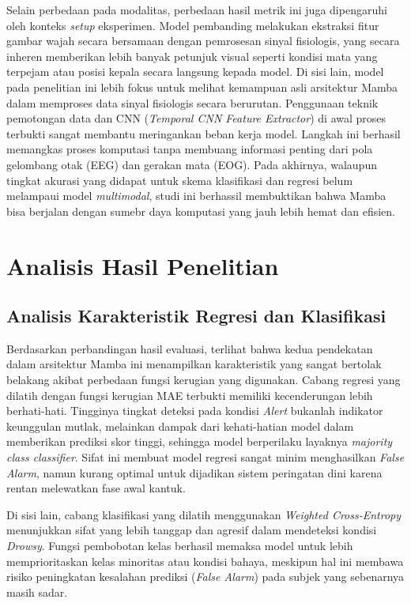 Selain perbedaan pada modalitas, perbedaan hasil metrik ini juga dipengaruhi oleh konteks \textit{setup} eksperimen. Model pembanding melakukan ekstraksi fitur gambar wajah secara bersamaan dengan pemrosesan sinyal fisiologis, yang secara inheren memberikan lebih banyak petunjuk visual seperti kondisi mata yang terpejam atau posisi kepala secara langsung kepada model. Di sisi lain, model pada penelitian ini lebih fokus untuk melihat kemampuan asli arsitektur Mamba dalam memproses data sinyal fisiologis secara berurutan. Penggunaan teknik pemotongan data dan CNN (\textit{Temporal CNN Feature Extractor}) di awal proses terbukti sangat membantu meringankan beban kerja model. Langkah ini berhasil memangkas proses komputasi tanpa membuang informasi penting dari pola gelombang otak (EEG) dan gerakan mata (EOG). Pada akhirnya, walaupun tingkat akurasi yang didapat untuk skema klasifikasi dan regresi belum melampaui model \textit{multimodal}, studi ini berhassil membuktikan bahwa Mamba bisa berjalan dengan sumebr daya komputasi yang jauh lebih hemat dan efisien. 

\section{Analisis Hasil Penelitian}

\subsection{Analisis Karakteristik Regresi dan Klasifikasi}
\label{subsec:analisis_karakteristik}

Berdasarkan perbandingan hasil evaluasi, terlihat bahwa kedua pendekatan dalam arsitektur Mamba ini menampilkan karakteristik yang sangat bertolak belakang akibat perbedaan fungsi kerugian yang digunakan. Cabang regresi yang dilatih dengan fungsi kerugian MAE terbukti memiliki kecenderungan lebih berhati-hati. Tingginya tingkat deteksi pada kondisi \textit{Alert} bukanlah indikator keunggulan mutlak, melainkan dampak dari kehati-hatian model dalam memberikan prediksi skor tinggi, sehingga model berperilaku layaknya \textit{majority class classifier}. Sifat ini membuat model regresi sangat minim menghasilkan \textit{False Alarm}, namun kurang optimal untuk dijadikan sistem peringatan dini karena rentan melewatkan fase awal kantuk.

Di sisi lain, cabang klasifikasi yang dilatih menggunakan \textit{Weighted Cross-Entropy} menunjukkan sifat yang lebih tanggap dan agresif dalam mendeteksi kondisi \textit{Drowsy}. Fungsi pembobotan kelas berhasil memaksa model untuk lebih memprioritaskan kelas minoritas atau kondisi bahaya, meskipun hal ini membawa risiko peningkatan kesalahan prediksi (\textit{False Alarm}) pada subjek yang sebenarnya masih sadar.

